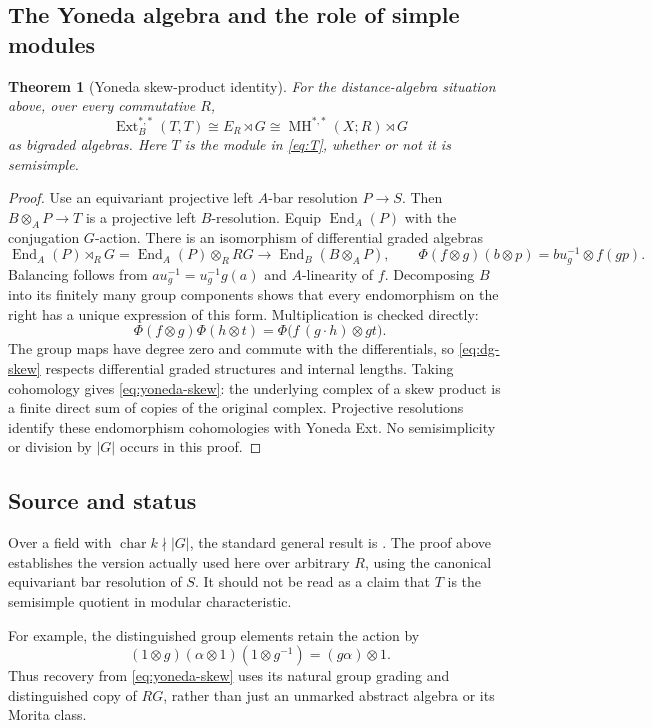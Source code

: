\documentclass[11pt,a4paper]{article}
\numberwithin{equation}{section}
\newtheorem{theorem}{Theorem}[section]
\theoremstyle{definition}
\theoremstyle{remark}
\newcommand{\G}{G}
\newcommand{\MH}{\operatorname{MH}}
\newcommand{\Ext}{\operatorname{Ext}}
\newcommand{\End}{\operatorname{End}}
\newcommand{\source}{\subsection*{\color{darkblue}Source and status}}
\begin{document}
\subsection{The Yoneda algebra and the role of simple modules}

\begin{theorem}[Yoneda skew-product identity]\label{thm:yoneda}
For the distance-algebra situation above, over every commutative $R$,
\begin{equation}\label{eq:yoneda-skew}
 \Ext_B^{*,*}(T,T)\cong E_R\rtimes\G
       \cong\MH^{*,*}(X;R)\rtimes\G
\end{equation}
as bigraded algebras.  Here $T$ is the module in \eqref{eq:T}, whether
or not it is semisimple.
\end{theorem}
\begin{proof}
Use an equivariant projective left $A$-bar resolution $P\to S$.
Then $B\otimes_A P\to T$ is a projective left $B$-resolution.
Equip $\End_A(P)$ with the conjugation $\G$-action.  There is an
isomorphism of differential graded algebras
\begin{equation}\label{eq:dg-skew}
 \End_A(P)\rtimes_R\G
   =\End_A(P)\otimes_R R\G
   \longrightarrow\End_B(B\otimes_A P),\qquad
 \Phi(f\otimes g)(b\otimes p)=b u_g^{-1}\otimes f(gp).
\end{equation}
Balancing follows from $a u_g^{-1}=u_g^{-1}g(a)$ and $A$-linearity
of $f$.  Decomposing $B$ into its finitely many group components shows
that every endomorphism on the right has a unique expression of this
form.  Multiplication is checked directly:
\[
 \Phi(f\otimes g)\Phi(h\otimes t)
      =\Phi\bigl(f\,(g\cdot h)\otimes gt\bigr).
\]
The group maps have degree zero and commute with the differentials,
so \eqref{eq:dg-skew} respects differential graded structures and
internal lengths.  Taking cohomology gives \eqref{eq:yoneda-skew}:
the underlying complex of a skew product is a finite direct sum of
copies of the original complex.  Projective resolutions identify
these endomorphism cohomologies with Yoneda Ext.  No semisimplicity
or division by $|\G|$ occurs in this proof.
\end{proof}
\source Over a field with $\operatorname{char}k\nmid|\G|$, the
standard general result is \cite[Theorem 10]{MV}.  The proof above
establishes the version actually used here over arbitrary $R$, using
the canonical equivariant bar resolution of $S$.  It should not be
read as a claim that $T$ is the semisimple quotient in modular
characteristic.

For example, the distinguished group elements retain the action by
\[
 (1\otimes g)(\alpha\otimes1)(1\otimes g^{-1})=(g\alpha)\otimes1.
\]
Thus recovery from \eqref{eq:yoneda-skew} uses its natural group
grading and distinguished copy of $R\G$, rather than just an
unmarked abstract algebra or its Morita class.
\end{document}
